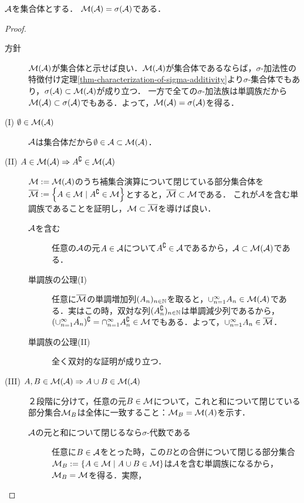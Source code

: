 \documentclass[uplatex, dvipdfmx]{jsreport}
\begin{document}
\begin{theorem}\label{thm-monotone-class-theorem}
    $\mathcal{A}$を集合体とする．
    $\mathcal{M}(\mathcal{A})=\sigma(\mathcal{A})$である．
\end{theorem}
\begin{proof}\mbox{}
    \begin{description}
        \item[方針] $\mathcal{M}(\mathcal{A})$が集合体と示せば良い．$\mathcal{M}(\mathcal{A})$が集合体であるならば，$\sigma$-加法性の特徴付け定理\ref{thm-characterization-of-sigma-additivity}より$\sigma$-集合体でもあり，$\sigma(\mathcal{A})\subset\mathcal{M}(\mathcal{A})$が成り立つ．
        一方で全ての$\sigma$-加法族は単調族だから$\mathcal{M}(\mathcal{A})\subset\sigma(\mathcal{A})$でもある．よって，$\mathcal{M}(\mathcal{A})=\sigma(\mathcal{A})$を得る．
        \item[(I) $\emptyset\in\mathcal{M}(\mathcal{A})$]
        $\mathcal{A}$は集合体だから$\emptyset\in\mathcal{A}\subset\mathcal{M}(\mathcal{A})$．
        \item[(II) $A\in\mathcal{M}(\mathcal{A})\Rightarrow A^\complement\in\mathcal{M}(\mathcal{A})$]
        $\mathcal{M}:=\mathcal{M}(\mathcal{A})$のうち補集合演算について閉じている部分集合体を$\overline{\mathcal{M}}:=\left\{A\in\mathcal{M}\mid A^\complement\in\mathcal{M}\right\}$とすると，$\overline{\mathcal{M}}\subset\mathcal{M}$である．
        これが$\mathcal{A}$を含む単調族であることを証明し，$\mathcal{M}\subset\overline{\mathcal{M}}$を導けば良い．
        \begin{description}
            \item[$\mathcal{A}$を含む] 任意の$\mathcal{A}$の元$A\in\mathcal{A}$について$A^\complement\in\mathcal{A}$であるから，$\mathcal{A}\subset\mathcal{M}(\mathcal{A})$である．
            \item[単調族の公理(I)] 任意に$\overline{\mathcal{M}}$の単調増加列$(A_n)_{n\in\mathbb{N}}$を取ると，$\cup^\infty_{n=1}A_n\in\mathcal{M}(\mathcal{A})$である．実はこの時，双対な列$(A_n^\complement)_{n\in\mathbb{N}}$は単調減少列であるから，$(\cup^\infty_{n=1}A_n)^\complement=\cap^\infty_{n=1}A_n^\complement\in\mathcal{M}$でもある．よって，$\cup^\infty_{n=1}A_n\in\overline{\mathcal{M}}$．
            \item[単調族の公理(II)] 全く双対的な証明が成り立つ．
        \end{description}
        \item[(III) $A,B\in\mathcal{M}(\mathcal{A})\Rightarrow A\cup B\in\mathcal{M}(\mathcal{A})$] ２段階に分けて，任意の元$B\in\mathcal{M}$について，これと和について閉じている部分集合$\mathcal{M}_B$は全体に一致すること：$\mathcal{M}_B=\mathcal{M}(A)$を示す．
            \begin{description}
                \item[$\mathcal{A}$の元と和について閉じるなら$\sigma$-代数である] 任意に$B\in\mathcal{A}$をとった時，この$B$との合併について閉じる部分集合$\mathcal{M}_B:=\left\{A\in\mathcal{M}\mid A\cup B\in\mathcal{M}\right\}$は$\mathcal{A}$を含む単調族になるから，$\mathcal{M}_B=\mathcal{M}$を得る．実際，
                \begin{enumerate}

\end{enumerate}
\end{description}
\end{description}
\end{proof}
\end{document}

